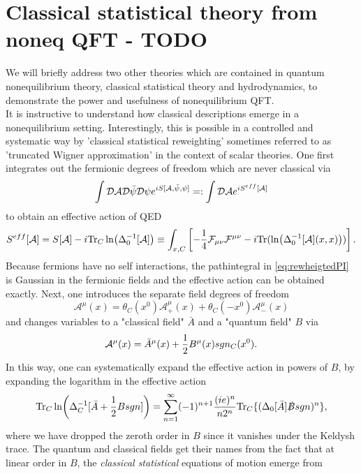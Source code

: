 \section{Classical statistical theory from noneq QFT - TODO}
We
will briefly address two other theories which are contained in quantum nonequilibrium theory, classical
statistical theory and hydrodynamics, to demonstrate the power and usefulness of nonequilibrium QFT.\\
It is instructive to understand how classical descriptions emerge in a
nonequilibrium setting. Interestingly, this is possible in a controlled and systematic way by ’classical
statistical reweighting’  sometimes referred to as ’truncated Wigner approximation’ in the
context of scalar theories. One first integrates out the fermionic degrees of freedom which are never
classical via
\begin{equation}
\label{eq:rewheigtedPI}
	\int \mathcal{D} \mathcal{A} \mathcal{D} \bar{\psi}\mathcal{D} \psi e^{i S[\mathcal{A}, \bar{\psi},\psi]} =: \int \mathcal{D} \mathcal{A} e^{i S^{eff}[\mathcal{A}]}
\end{equation}
to obtain an effective action of QED
\begin{equation}
	S^{eff}[\mathcal{A}] = S[\mathcal{A}] - i \mathrm{Tr}_C\ln(\Delta^{-1}_0[\mathcal{A}]) \equiv \int_{x,C} \left[-\frac{1}{4} \mathcal{F}_{\mu \nu} \mathcal{F}^{\mu\nu} - i \mathrm{Tr}(\ln(\Delta^{-1}_0[\mathcal{A}] (x,x)))\right].
\end{equation}
Because fermions have no self interactions, the pathintegral in \ref{eq:rewheigtedPI} is Gaussian in the fermionic fields and the effective action can be obtained exactly. Next, one introduces the separate field degrees of freedom 
\begin{equation}
	\mathcal{A}^\mu(x) = \theta_C(x^0) \mathcal{A}^\mu_+(x) + \theta_C(-x^0) \mathcal{A}^\mu_-(x)
\end{equation}
and changes variables to a "classical field" $\bar{A}$ and a "quantum field" $B$ via
\begin{equation}
	\mathcal{A}^\mu(x) = \bar{A}^\mu(x) + \frac{1}{2} B^\mu(x) sgn_C(x^0).
\end{equation}
In this way, one can systematically expand the effective action in powers of $B$, by expanding the logarithm in the effective action
\begin{equation}
	\mathrm{Tr}_C\ln(\Delta^{-1}_C[\bar{A}+ \frac{1}{2} B sgn]) = \sum_{n=1}^{\infty} (-1)^{n+1} \frac{(ie)^n}{n 2^n} \mathrm{Tr}_C \{(\Delta_0[\bar{A}] \slashed{B} sgn)^n\},
\end{equation}
where we have dropped the zeroth order in $B$ since it vanishes under the Keldysh trace. The quantum and classical fields get their names from the fact that at linear order in $B$, the \emph{classical statistical} equations of motion emerge from
